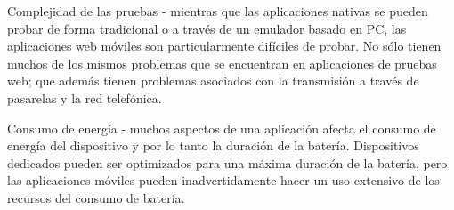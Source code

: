 \begin{enumeracion}
\item Complejidad de las pruebas - mientras que las aplicaciones nativas se pueden probar de forma tradicional o a través de un emulador basado en PC, las aplicaciones web móviles son particularmente difíciles de probar. No sólo tienen muchos de los mismos problemas que se encuentran en aplicaciones de pruebas web; que además tienen problemas asociados con la transmisión a través de pasarelas y la red telefónica.
\item Consumo de energía - muchos aspectos de una aplicación afecta el consumo de energía del dispositivo y por lo tanto la duración de la batería. Dispositivos dedicados pueden ser optimizados para una máxima duración de la batería, pero las aplicaciones móviles pueden inadvertidamente hacer un uso extensivo de los recursos del consumo de batería.


\end{enumeracion}

